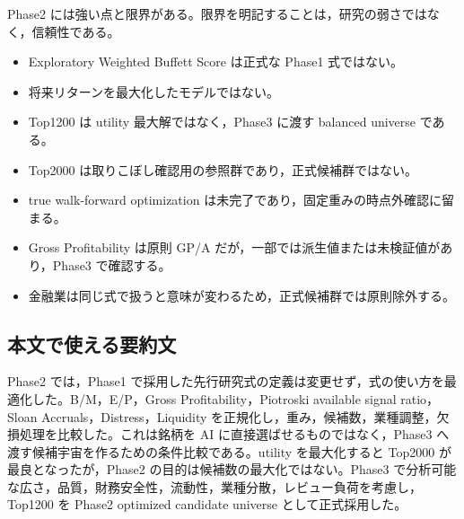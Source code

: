 \documentclass[a4paper,10pt]{article}
\begin{document}
Phase2 には強い点と限界がある。限界を明記することは，研究の弱さではなく，信頼性である。
\begin{itemize}
\item Exploratory Weighted Buffett Score は正式な Phase1 式ではない。
\item 将来リターンを最大化したモデルではない。
\item Top1200 は utility 最大解ではなく，Phase3 に渡す balanced universe である。
\item Top2000 は取りこぼし確認用の参照群であり，正式候補群ではない。
\item true walk-forward optimization は未完了であり，固定重みの時点外確認に留まる。
\item Gross Profitability は原則 GP/A だが，一部では派生値または未検証値があり，Phase3 で確認する。
\item 金融業は同じ式で扱うと意味が変わるため，正式候補群では原則除外する。
\end{itemize}

\subsection{本文で使える要約文}
\begin{keybox}
Phase2 では，Phase1 で採用した先行研究式の定義は変更せず，式の使い方を最適化した。B/M，E/P，Gross Profitability，Piotroski available signal ratio，Sloan Accruals，Distress，Liquidity を正規化し，重み，候補数，業種調整，欠損処理を比較した。これは銘柄を AI に直接選ばせるものではなく，Phase3 へ渡す候補宇宙を作るための条件比較である。utility を最大化すると Top2000 が最良となったが，Phase2 の目的は候補数の最大化ではない。Phase3 で分析可能な広さ，品質，財務安全性，流動性，業種分散，レビュー負荷を考慮し，Top1200 を Phase2 optimized candidate universe として正式採用した。
\end{keybox}

\newpage
\end{document}
